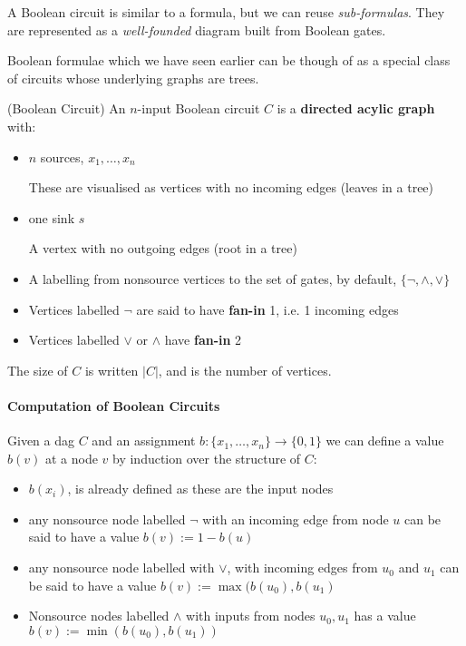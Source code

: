 \documentclass{report}
\begin{document}
A Boolean circuit is similar to a formula, but we can reuse \textit{sub-formulas}. They are represented as a \textit{well-founded} diagram built from Boolean gates.

Boolean formulae which we have seen earlier can be though of as a special class of circuits whose underlying graphs are trees.


\begin{definition}(Boolean Circuit)
  An $n$-input Boolean circuit $C$ is a \textbf{directed acylic graph} with:

  \begin{itemize}
    \item $n$ sources, $x_{1},\ldots,x_{n}$

          These are visualised as vertices with no incoming edges (leaves in a tree)

    \item one sink $s$

          A vertex with no outgoing edges (root in a tree)


    \item A labelling from nonsource vertices to the set of gates, by default, $\{ \neg,\wedge, \vee \} $
    \item Vertices labelled $\neg$ are said to have \textbf{fan-in} 1, i.e. 1 incoming edges
    \item Vertices labelled $\vee$ or \(\wedge\) have \textbf{fan-in} 2
  \end{itemize}

  The size of $C$ is written $|C|$, and is the number of vertices.
\end{definition}

\paragraph{Computation of Boolean Circuits}

Given a dag $C$ and an assignment $b: \{ x_{1},\ldots,x_{n} \} \rightarrow \{ 0,1 \}  $ we can define a value $b(v)$ at a node $v$ by induction over the structure of $C$:

\begin{itemize}
  \item $b(x_{i})$, is already defined as these are the input nodes
  \item any nonsource node labelled $\neg$ with an incoming edge from node $u$ can be said to have a value $b(v) := 1-b(u)$
  \item any nonsource node labelled with $\vee$, with incoming edges from $u_{0}$ and $u_{1}$ can be said to have a value $b(v) := \max(b(u_{0}),b(u_{1})$
  \item Nonsource nodes labelled $\wedge$ with inputs from nodes $u_{0},u_{1}$ has a value $b(v) := \min(b(u_{0}),b(u_{1}))$
\end{itemize}
\end{document}
